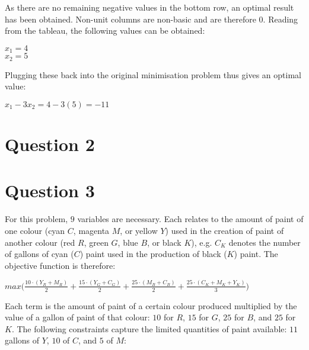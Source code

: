 \documentclass[11pt]{article} %
\begin{document}
As there are no remaining negative values in the bottom row, an optimal result has been obtained. Non-unit columns are non-basic and are therefore $0$. Reading from the tableau, the following values can be obtained:

\begin{center}

	$x_1 = 4$ \\
	$x_2 = 5$

\end{center}

Plugging these back into the original minimisation problem thus gives an optimal value:

\begin{center}

	$x_1 - 3x_2 = 4 - 3(5) = -11$

\end{center}

\clearpage

\section*{Question 2}

\clearpage

\section*{Question 3}

For this problem, $9$ variables are necessary. Each relates to the amount of paint of one colour (cyan $C$, magenta $M$, or yellow $Y$) used in the creation of paint of another colour (red $R$, green $G$, blue $B$, or black $K$), e.g. $C_K$ denotes the number of gallons of cyan ($C$) paint used in the production of black ($K$) paint. The objective function is therefore:

\begin{center}

$max \bigl( \frac{10 \cdot (Y_R + M_R)}{2} + \frac{15 \cdot (Y_G + C_G)}{2} + \frac{25 \cdot (M_B + C_B)}{2} + \frac{25 \cdot (C_K + M_K + Y_K)}{3}\bigr)$

\end{center}

Each term is the amount of paint of a certain colour produced multiplied by the value of a gallon of paint of that colour: $10$ for $R$, $15$ for $G$, $25$ for $B$, and $25$ for $K$. The following constraints capture the limited quantities of paint available: $11$ gallons of $Y$, $10$ of $C$, and $5$ of $M$:
\end{document}
